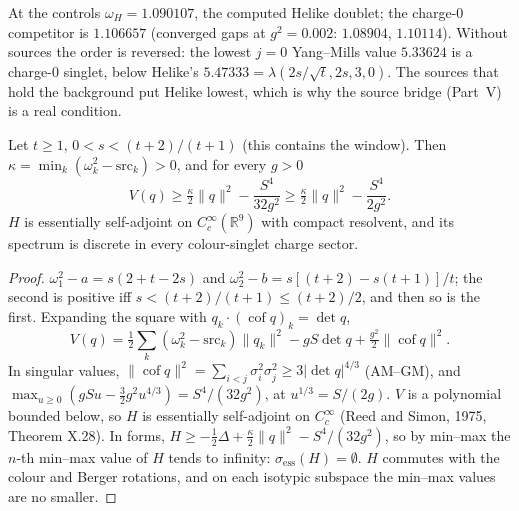 \begin{remark}\label{p3rem:order}
 At the controls $\omega_H=1.090107$, the computed Helike doublet; the charge-$0$ competitor is $1.106657$
(converged gaps at $g^2=0.002$: $1.08904$, $1.10114$). Without sources the order is reversed: the lowest $j=0$ Yang--Mills
value $5.33624$ is a charge-$0$ singlet, below Helike's $5.47333=\lambda(2s/\sqrt t,2s,3,0)$. The sources that hold the
background put Helike lowest, which is why the source bridge (Part~V) is a real condition.
\end{remark}

\begin{theorem}\label{p3thm:A}
 Let $t\geq1$, $0<s<(t+2)/(t+1)$ (this contains the window). Then
$\kappa=\min_k(\omega_k^2-\mathrm{src}_k)>0$, and for every $g>0$
\[
 V(q)\geq\tfrac\kappa2\|q\|^2-\frac{S^4}{32g^2}\geq\tfrac\kappa2\|q\|^2-\frac{S^4}{2g^2}.
\]
$H$ is essentially self-adjoint on $C_c^\infty(\mathbb R^9)$ with compact resolvent, and its spectrum is discrete in every
colour-singlet charge sector.
\end{theorem}
\begin{proof}
$\omega_1^2-a=s(2+t-2s)$ and $\omega_2^2-b=s[(t+2)-s(t+1)]/t$; the second is positive iff $s<(t+2)/(t+1)\leq(t+2)/2$, and then so
is the first. Expanding the square with $q_k\cdot(\operatorname{cof}q)_k=\det q$,
\[
 V(q)=\tfrac12\textstyle\sum_k(\omega_k^2-\mathrm{src}_k)\|q_k\|^2-gS\det q+\tfrac{g^2}2\|\operatorname{cof}q\|^2 .
\]
In singular values, $\|\operatorname{cof}q\|^2=\sum_{i<j}\sigma_i^2\sigma_j^2\geq3|\det q|^{4/3}$ (AM--GM), and
$\max_{u\geq0}(gSu-\tfrac32g^2u^{4/3})=S^4/(32g^2)$, at $u^{1/3}=S/(2g)$. $V$ is a polynomial bounded below, so $H$ is
essentially self-adjoint on $C_c^\infty$ (Reed and Simon, 1975, Theorem X.28). In forms,
$H\geq-\tfrac12\Delta+\tfrac\kappa2\|q\|^2-S^4/(32g^2)$, so by min--max the $n$-th min--max value of $H$ tends to infinity:
$\sigma_{\mathrm{ess}}(H)=\emptyset$. $H$ commutes with the colour and Berger rotations, and on each isotypic subspace the
min--max values are no smaller.
\end{proof}

